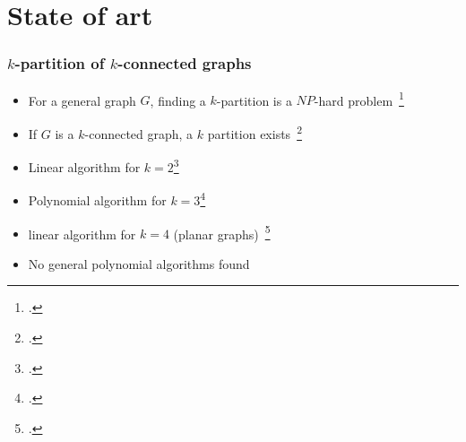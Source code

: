 \section{State of art}
%


\begin{frame}
  \frametitle{$k$-partition of $k$-connected graphs}
  \begin{itemize}
  \item For a general graph $G$, finding a $k$-partition is a $NP$-hard
    problem~\footcite{BF06}%
  \item If $G$ is a $k$-connected graph, a $k$ partition exists~\footcite{GE78,LL77}
  \item Linear algorithm for $k = 2$\footcite{Suzuki1990227}
  \item Polynomial algorithm for $k = 3$\footcite{Wada1994}
  \item linear algorithm for $k = 4$ (planar graphs)~\footcite{Nakano1997315}
  \item No general polynomial algorithms found
  \end{itemize}
\end{frame}

